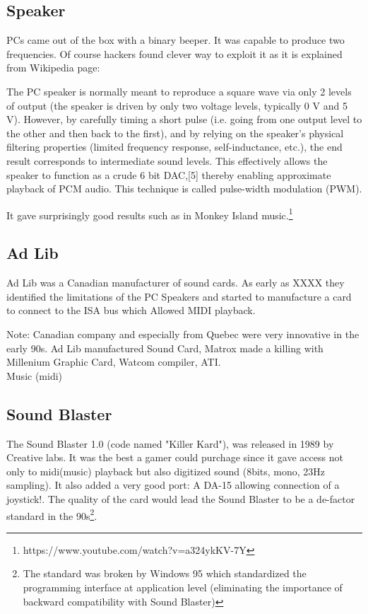 \documentclass[book.tex]{subfiles}
\begin{document}
  \subsection{Speaker}
  PCs came out of the box with a binary beeper. It was capable to produce two frequencies. Of course hackers found clever way to exploit it as it is explained from Wikipedia page:\\
\par
 \begin{fancyquotes}
  The PC speaker is normally meant to reproduce a square wave via only 2 levels of output (the speaker is driven by only two voltage levels, typically 0 V and 5 V). However, by carefully timing a short pulse (i.e. going from one output level to the other and then back to the first), and by relying on the speaker's physical filtering properties (limited frequency response, self-inductance, etc.), the end result corresponds to intermediate sound levels. This effectively allows the speaker to function as a crude 6 bit DAC,[5] thereby enabling approximate playback of PCM audio. This technique is called pulse-width modulation (PWM).
 \end{fancyquotes}
\par
  It gave surprisingly good results such as in Monkey Island music.\footnote{https://www.youtube.com/watch?v=a324ykKV-7Y}
  



  \subsection{Ad Lib}
  Ad Lib was a Canadian manufacturer of sound cards. As early as XXXX they identified the limitations of the PC Speakers and started to manufacture a card to connect to the ISA bus which Allowed MIDI playback.
  
  Note: Canadian company and especially from Quebec were very innovative in the early 90s. Ad Lib manufactured Sound Card, Matrox made a killing with Millenium Graphic Card, Watcom compiler, ATI.\\
  
  Music (midi)
  
  \subsection{Sound Blaster}
  The Sound Blaster 1.0 (code named "Killer Kard"), was released in 1989 by Creative labs. It was the best a gamer could purchage since it gave access not only to midi(music) playback but also digitized sound (8bits, mono, 23Hz sampling). It also added a very good port: A DA-15 allowing connection of a joystick!. The quality of the card would lead the Sound Blaster to be a de-factor standard in the 90s\footnote{The standard was broken by Windows 95 which standardized the programming interface at application level (eliminating the importance of backward compatibility with Sound Blaster)}.
  
\end{document}
